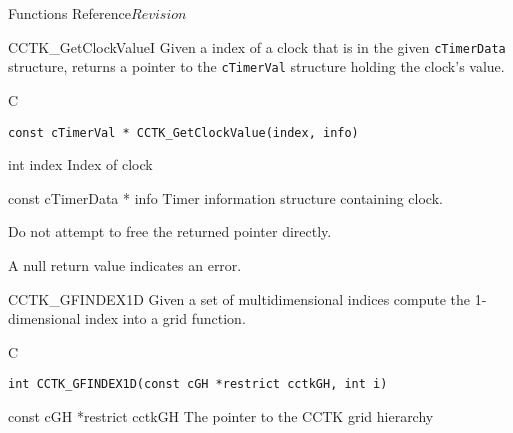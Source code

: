 \begin{cactuspart}{ Functions Reference}{}{$Revision$}
\begin{FunctionDescription}{CCTK\_GetClockValueI}
\label{CCTK-GetClockValueI}
Given a index of a clock that is
in the given {\tt cTimerData} structure,
returns a pointer to the {\tt cTimerVal} structure holding the clock's value.
\begin{SynopsisSection}
\begin{Synopsis}{C}
\begin{verbatim}
const cTimerVal * CCTK_GetClockValue(index, info)
\end{verbatim}
\end{Synopsis}
\end{SynopsisSection}

\begin{ParameterSection}
\begin{Parameter} {int index}
Index of clock
\end{Parameter}

\begin{Parameter} {const cTimerData * info}
Timer information structure containing clock.
\end{Parameter}
\end{ParameterSection}

\begin{Discussion}
Do not attempt to free the returned pointer directly.
\end{Discussion}
\begin{ErrorSection}
\begin{Error}
A null return value indicates an error.
\end{Error}
\end{ErrorSection}
\end{FunctionDescription}



\begin{FunctionDescription}{CCTK\_GFINDEX1D}
\label{CCTK-GFINDEX1D}
Given a set of multidimensional indices compute the 1-dimensional index into a
grid function.
\begin{SynopsisSection}
\begin{Synopsis}{C}
\begin{verbatim}
int CCTK_GFINDEX1D(const cGH *restrict cctkGH, int i)
\end{verbatim}
\end{Synopsis}
\end{SynopsisSection}

\begin{ParameterSection}
\begin{Parameter} {const cGH *restrict cctkGH}
The pointer to the CCTK grid hierarchy
\end{Parameter}


\end{ParameterSection}
\end{FunctionDescription}
\end{cactuspart}

